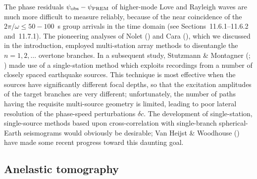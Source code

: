 The phase residuals $\psi_{\rm obs}-\psi_{\rm PREM}$
of higher-mode Love and Rayleigh waves are much more difficult
to measure reliably, because of the near coincidence of the
$2\pi/\omega\leq 50\!-\!100$~s group arrivals in the time domain
(see Sections~11.6.1--11.6.2 and~11.7.1).  The pioneering analyses of
Nolet (\citeyear{nolet77}) and Cara (\citeyear{cara78}), which
we discussed in the introduction, employed multi-station array
methods to disentangle the $n=1,2,\ldots$ overtone branches. In a subsequent
study, Stutzmann \& Montagner (\citeyear{stutzmann&montagner93};
\citeyear{stutzmann&montagner94}) made use of a single-station
method which exploits recordings from a number of closely
spaced earthquake sources.  This technique is most effective when
the sources have significantly different focal depths, so
that the excitation amplitudes of the target branches
are very different; unfortunately, the number of paths having
the requisite multi-source geometry is limited, leading to poor
lateral resolution of the phase-speed perturbations $\delta c$.
The development of single-station, single-source methods based
upon cross-correlation with single-branch spherical-Earth
seismograms would obviously be desirable; Van Heijst \& Woodhouse
(\citeyear{vanheijst&woodhouse97}) have made some recent
%
%
%
progress toward this daunting goal.

\subsection{Anelastic tomography}
%
%

